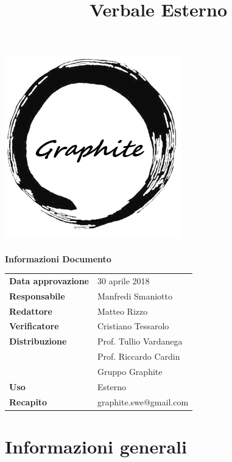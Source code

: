 \documentclass[openany,12pt,a4paper]{article}
\title{Verbale Esterno}
\author{}
\begin{document}
 
  \makeatletter 
  \begin{titlepage} 
    \setlength{\headsep}{0pt}   
    \begin{center} 
      \includegraphics[width=0.5\linewidth]{Logo.png}\\[1em] 
      {\huge \bfseries  \@title }\\[10ex] 
      \textbf{\Large Informazioni Documento} \\[2em] 
      \bgroup 
      \def\arraystretch{1.5} 
      \begin{tabular}{l|l} 
        \textbf{Data approvazione} & 30 aprile 2018 \\ 
        \textbf{Responsabile} & Manfredi Smaniotto \\ 
        \textbf{Redattore} & Matteo Rizzo \\ 
        \textbf{Verificatore} & Cristiano Tessarolo \\ 
        \textbf{Distribuzione} & Prof. Tullio Vardanega \\ 
         & Prof. Riccardo Cardin \\ 
         & Gruppo Graphite \\ 
        \textbf{Uso} & Esterno \\ 
        \textbf{Recapito} & graphite.swe@gmail.com \\ 
      \end{tabular} 
    \egroup 
    \end{center} 
  \end{titlepage} 
  \makeatother 
 
  \thispagestyle{empty} 
  \newpage 
   
  \tableofcontents 
  \newpage 
   
  \section{Informazioni generali} 
   
\end{document}
